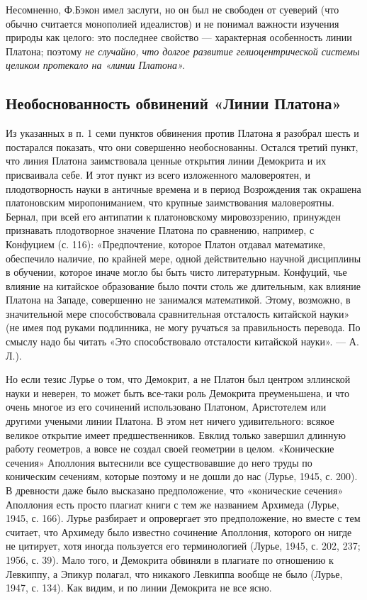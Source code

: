 Несомненно, Ф.Бэкон имел заслуги, но он был не свободен от суеверий
(что обычно считается монополией идеалистов) и не понимал важности
изучения природы как целого: это последнее свойство --- характерная
особенность линии Платона; поэтому \emph{не случайно, что долгое
развитие гелиоцентрической системы целиком протекало на «линии
Платона».}

\subsection{Необоснованность обвинений «Линии Платона»}

Из указанных в п. 1 семи пунктов обвинения против Платона я
разобрал шесть и постарался показать, что они совершенно
необоснованны. Остался третий пункт, что линия Платона заимствовала
ценные открытия линии Демокрита и их присваивала себе. И этот пункт из
всего изложенного маловероятен, и плодотворность науки в античные
времена и в период Возрождения так окрашена платоновским
миропониманием, что крупные заимствования маловероятны. Бернал, при
всей его антипатии к платоновскому мировоззрению, принужден признавать
плодотворное значение Платона по сравнению, например, с Конфуцием (с.
116): «Предпочтение, которое Платон отдавал математике, обеспечило
наличие, по крайней мере, одной действительно научной дисциплины в
обучении, которое иначе могло бы быть чисто литературным. Конфуций,
чье влияние на китайское образование было почти столь же длительным,
как влияние Платона на Западе, совершенно не занимался математикой.
Этому, возможно, в значительной мере способствовала сравнительная
отсталость китайской науки» (не имея под руками подлинника, не могу
ручаться за правильность перевода. По смыслу надо бы читать «Это
способствовало отсталости китайской науки». --- А. Л.).

Но если тезис Лурье о том, что Демокрит, а не Платон был центром
эллинской науки и неверен, то может быть все-таки роль Демокрита
преуменьшена, и что очень многое из его сочинений использовано
Платоном, Аристотелем или другими учеными линии Платона. В этом нет
ничего удивительного: всякое великое открытие имеет предшественников.
Евклид только завершил длинную работу геометров, а вовсе не создал
своей геометрии в целом. «Конические сечения» Аполлония вытеснили все
существовавшие до него труды по коническим сечениям, которые поэтому и
не дошли до нас (Лурье, 1945, с. 200). В древности даже было высказано
предположение, что «конические сечения» Аполлония есть просто плагиат
книги с тем же названием Архимеда (Лурье, 1945, с. 166). Лурье
разбирает и опровергает это предположение, но вместе с тем считает,
что Архимеду было известно сочинение Аполлония, которого он нигде не
цитирует, хотя иногда пользуется его терминологией (Лурье, 1945, с.
202, 237; 1956, с. 39). Мало того, и Демокрита обвиняли в плагиате по
отношению к Левкиппу, а Эпикур полагал, что никакого Левкиппа вообще
не было (Лурье, 1947, с. 134). Как видим, и по линии Демокрита не все
ясно.

